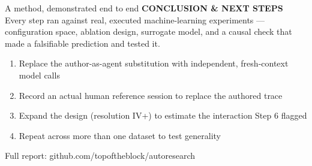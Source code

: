 \documentclass[aspectratio=169,11pt]{beamer}
\newcommand{\kicker}[1]{{\scriptsize\bfseries\color{accentDk}\MakeUppercase{#1}}\\[2pt]}
\begin{document}
{
\begin{frame}{A method, demonstrated end to end}
\kicker{Conclusion \& next steps}
\small
Every step ran against real, executed machine-learning experiments --- configuration space, ablation design, surrogate model, and a causal check that made a falsifiable prediction and tested it.
\vspace{4mm}

\begin{enumerate}
\small
\item Replace the author-as-agent substitution with independent, fresh-context model calls
\item Record an actual human reference session to replace the authored trace
\item Expand the design (resolution IV+) to estimate the interaction Step 6 flagged
\item Repeat across more than one dataset to test generality
\end{enumerate}

\vspace{6mm}
{\scriptsize\color{mute!70!white} Full report: github.com/topoftheblock/autoresearch}
\end{frame}
}
\end{document}
